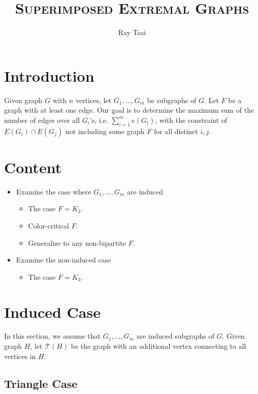 \documentclass[a4paper]{article}
\title{\textsc{Superimposed Extremal Graphs}}
\author{Ray Tsai}
\date{}
\begin{document}
\maketitle
                                                                                                                                
\section{Introduction}

Given graph $G$ with $n$ vertices, let $G_1, \ldots, G_m$ be subgraphs of $G$. Let $F$ be a graph
with at least one edge. Our goal is to determine the maximum sum of the number of edges over all
$G_i$'s, i.e. $\sum_{i = 1}^m e(G_i)$, with the constraint of $E(G_i) \cap E(G_j)$ not including
some graph $F$ for all distinct $i, j$. 

\section{Content}

\begin{itemize}
  \item Examine the case where $G_1, \ldots, G_m$ are induced
  \begin{itemize}
    \item The case $F = K_3$.
    \item Color-critical $F$.
    \item Generalize to any non-bipartite $F$.
  \end{itemize}
  \item Examine the non-induced case
  \begin{itemize}
    \item The case $F = K_3$.
  \end{itemize}
\end{itemize}


\section{Induced Case}

In this section, we assume that $G_1, \ldots, G_m$ are induced subgraphs of $G$. Given graph $H$,
let $\mathcal{T}(H)$ be the graph with an additional vertex connecting to all vertices in $H$.

\subsection{Triangle Case}
\end{document}

